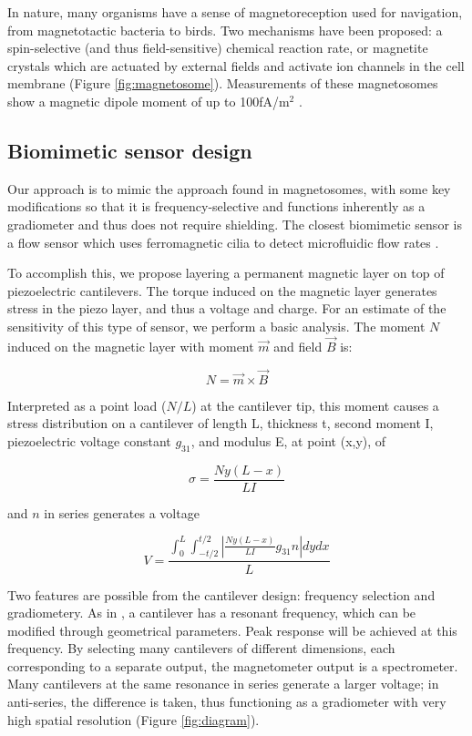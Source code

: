 In nature, many organisms have a sense of magnetoreception used for navigation, from magnetotactic bacteria to birds. Two mechanisms have been proposed: a spin-selective (and thus field-sensitive) chemical reaction rate, or magnetite crystals which are actuated by external fields and activate ion channels in the cell membrane (Figure \ref{fig:magnetosome})\cite{johnsen2005physics,dodson2013radical,kirschvink2001magnetite}. Measurements of these magnetosomes show a magnetic dipole moment of up to 100fA/m$^2$ \cite{hanzlik2002pulsed,eder2012magnetic}.

\subsection{Biomimetic sensor design}

Our approach is to mimic the approach found in magnetosomes, with some key modifications so that it is frequency-selective and functions inherently as a gradiometer and thus does not require shielding. The closest biomimetic sensor is a flow sensor which uses ferromagnetic cilia to detect microfluidic flow rates \cite{alfadhel2014magnetic}.

To accomplish this, we propose layering a permanent magnetic layer on top of piezoelectric cantilevers. The torque induced on the magnetic layer generates stress in the piezo layer, and thus a voltage and charge. For an estimate of the sensitivity of this type of sensor, we perform a basic analysis. The moment $N$ induced on the magnetic layer with moment $\vec{m}$ and field $\vec{B}$ is:

$$  N=\vec{m} \times \vec{B} $$

Interpreted as a point load ($N/L$) at the cantilever tip, this moment causes a stress distribution on a cantilever of length L, thickness t, second moment I, piezoelectric voltage constant $g_{31}$, and modulus E, at point (x,y), of

$$ \sigma=\frac{Ny(L-x)}{LI} $$

and $n$ in series generates a voltage

$$ V=\frac{\int_0^L\int_{-t/2}^{t/2}\left|\frac{Ny(L-x)}{LI}g_{31}n\right|dydx}{L} $$


Two features are possible from the cantilever design: frequency selection and gradiometery. As in \cite{shen2008design}, a cantilever has a resonant frequency, which can be modified through geometrical parameters. Peak response will be achieved at this frequency. By selecting many cantilevers of different dimensions, each corresponding to a separate output, the magnetometer output is a spectrometer. Many cantilevers at the same resonance in series generate a larger voltage; in anti-series, the difference is taken, thus functioning as a gradiometer with very high spatial resolution (Figure \ref{fig:diagram}).

